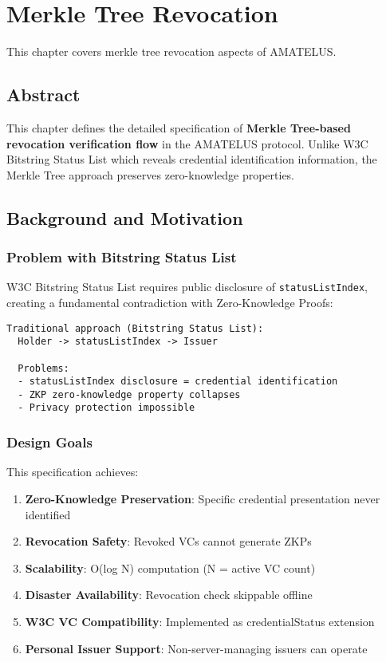 \chapter{Merkle Tree Revocation}


\begin{definition}
  \label{def:revoke-chapter}
  This chapter covers merkle tree revocation aspects of AMATELUS.
  \leanok
\end{definition}
\section{Abstract}

This chapter defines the detailed specification of \textbf{Merkle Tree-based revocation verification flow} in the AMATELUS protocol. Unlike W3C Bitstring Status List which reveals credential identification information, the Merkle Tree approach preserves zero-knowledge properties.

\section{Background and Motivation}

\subsection{Problem with Bitstring Status List}

W3C Bitstring Status List requires public disclosure of \texttt{statusListIndex}, creating a fundamental contradiction with Zero-Knowledge Proofs:

\begin{verbatim}
Traditional approach (Bitstring Status List):
  Holder -> statusListIndex -> Issuer

  Problems:
  - statusListIndex disclosure = credential identification
  - ZKP zero-knowledge property collapses
  - Privacy protection impossible
\end{verbatim}

\subsection{Design Goals}

This specification achieves:

\begin{enumerate}
  \item \textbf{Zero-Knowledge Preservation}: Specific credential presentation never identified
  \item \textbf{Revocation Safety}: Revoked VCs cannot generate ZKPs
  \item \textbf{Scalability}: O(log N) computation (N = active VC count)
  \item \textbf{Disaster Availability}: Revocation check skippable offline
  \item \textbf{W3C VC Compatibility}: Implemented as credentialStatus extension
  \item \textbf{Personal Issuer Support}: Non-server-managing issuers can operate
\end{enumerate}

